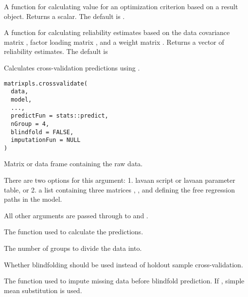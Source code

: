 \documentclass[a4paper]{book}
\begin{document}
\begin{Arguments}
\begin{ldescription}
\item[\code{optimCrit}] A function for calculating value for an optimization criterion based on a
 result object. Returns a scalar. The default is .

\item[\code{reliabilities}] A function for calculating reliability estimates based on the 
data covariance matrix , factor loading matrix , and a weight matrix .
Returns a vector of reliability estimates. The default is
\end{ldescription}
\end{Arguments}
%
\begin{Description}\relax
{} Calculates cross-validation predictions using .
\end{Description}
%
\begin{Usage}
\begin{verbatim}
matrixpls.crossvalidate(
  data,
  model,
  ...,
  predictFun = stats::predict,
  nGroup = 4,
  blindfold = FALSE,
  imputationFun = NULL
)
\end{verbatim}
\end{Usage}
%
\begin{Arguments}
\begin{ldescription}
\item[\code{data}] Matrix or data frame containing the raw data.

\item[\code{model}] There are two options for this argument: 1. lavaan script or lavaan parameter
table, or 2. a list containing three matrices
, , and  defining the free regression paths
in the model.

\item[\code{...}] All other arguments are passed through to  and .

\item[\code{predictFun}] The function used to calculate the predictions.

\item[\code{nGroup}] The number of groups to divide the data into.

\item[\code{blindfold}] Whether blindfolding should be used instead of holdout sample cross-validation.

\item[\code{imputationFun}] The function used to impute missing data before blindfold prediction. 
If , simple mean substitution is used.
\end{ldescription}
\end{Arguments}
\end{document}
